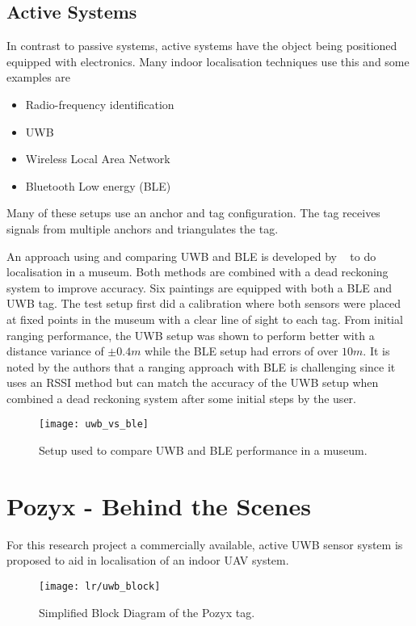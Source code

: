 \subsection{Active Systems}
In contrast to passive systems, active systems have the object being positioned equipped with electronics.
Many indoor localisation techniques use this and some examples are ~\citep{deak2012survey}
\begin{itemize}
    \item Radio-frequency identification
    \item UWB
    \item Wireless Local Area Network
    \item Bluetooth Low energy (BLE)
\end{itemize}
Many of these setups use an anchor and tag configuration.
The tag receives signals from multiple anchors and triangulates the tag.

An approach using and comparing UWB and BLE is developed by ~\cite{findobjs} to do localisation in a museum.
Both methods are combined with a dead reckoning system to improve accuracy.
Six paintings are equipped with both a BLE and UWB tag.
The test setup first did a calibration where both sensors were placed at fixed points in the museum with a clear line of sight to each tag.
From initial ranging performance, the UWB setup was shown to perform better with a distance variance of $\pm0.4m$ while the BLE setup had errors of over $10m$.
It is noted by the authors that a ranging approach with BLE is challenging since it uses an RSSI method but can match the accuracy of the UWB setup when combined a dead reckoning system after some initial steps by the user.

\begin{figure}[h!]
    \centering
    \texttt{[image: uwb\_vs\_ble]}
    \caption{Setup used to compare UWB and BLE performance in a museum.}
    \label{fig:uwbvsble}
\end{figure}

\section{Pozyx - Behind the Scenes}\label{sec:pozyx---behind-the-scenes}
For this research project a commercially available, active UWB sensor system is proposed to aid in localisation of an indoor UAV system.
\begin{figure}[h!]
    \centering
    \texttt{[image: lr/uwb\_block]}
    \caption{Simplified Block Diagram of the Pozyx tag.}
\end{figure}
